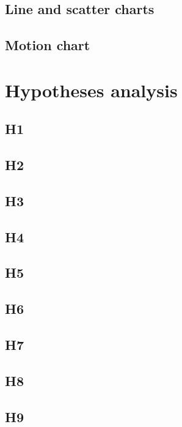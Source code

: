 \subsection{Line and scatter charts}


\subsection{Motion chart}


\section{Hypotheses analysis}


\subsection*{H1}

\subsection*{H2}

\subsection*{H3}

\subsection*{H4}

\subsection*{H5}

\subsection*{H6}

\subsection*{H7}

\subsection*{H8}

\subsection*{H9}

